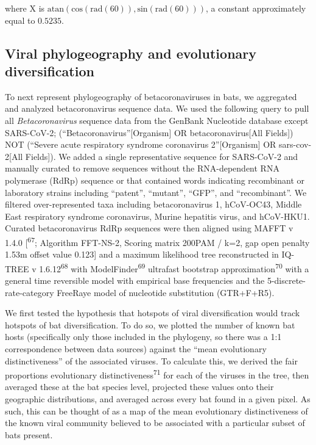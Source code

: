 \documentclass[10pt,oneside]{article}
\begin{document}
where X is
\(\text{atan}\left(\text{cos}(\text{rad}(60)), \text{sin}(\text{rad}(60))\right)\),
a constant approximately equal to \(0.5235\).

\hypertarget{viral-phylogeography-and-evolutionary-diversification}{%
\subsection{Viral phylogeography and evolutionary
diversification}\label{viral-phylogeography-and-evolutionary-diversification}}

To next represent phylogeography of betacoronaviruses in bats, we
aggregated and analyzed betacoronavirus sequence data. We used the
following query to pull all \emph{Betacoronavirus} sequence data from
the GenBank Nucleotide database except SARS-CoV-2;
(``Betacoronavirus''{[}Organism{]} OR betacoronavirus{[}All Fields{]})
NOT (``Severe acute respiratory syndrome coronavirus 2''{[}Organism{]}
OR sars-cov-2{[}All Fields{]}). We added a single representative
sequence for SARS-CoV-2 and manually curated to remove sequences without
the RNA-dependent RNA polymerase (RdRp) sequence or that contained words
indicating recombinant or laboratory strains including ``patent'',
``mutant'', ``GFP'', and ``recombinant''. We filtered over-represented
taxa including betacoronavirus 1, hCoV-OC43, Middle East respiratory
syndrome coronavirus, Murine hepatitis virus, and hCoV-HKU1. Curated
betacoronavirus RdRp sequences were then aligned using MAFFT v 1.4.0
{[}\textsuperscript{67}; Algorithm FFT-NS-2, Scoring matrix 200PAM /
k=2, gap open penalty 1.53m offset value 0.123{]} and a maximum
likelihood tree reconstructed in IQ-TREE v 1.6.12\textsuperscript{68}
with ModelFinder\textsuperscript{69} ultrafast bootstrap
approximation\textsuperscript{70} with a general time reversible model
with empirical base frequencies and the 5-discrete-rate-category
FreeRaye model of nucleotide substitution (GTR+F+R5).

We first tested the hypothesis that hotspots of viral diversification
would track hotspots of bat diversification. To do so, we plotted the
number of known bat hosts (specifically only those included in the
phylogeny, so there was a 1:1 correspondence between data sources)
against the ``mean evolutionary distinctiveness'' of the associated
viruses. To calculate this, we derived the fair proportions evolutionary
distinctiveness\textsuperscript{71} for each of the viruses in the tree,
then averaged these at the bat species level, projected these values
onto their geographic distributions, and averaged across every bat found
in a given pixel. As such, this can be thought of as a map of the mean
evolutionary distinctiveness of the known viral community believed to be
associated with a particular subset of bats present.
\end{document}
